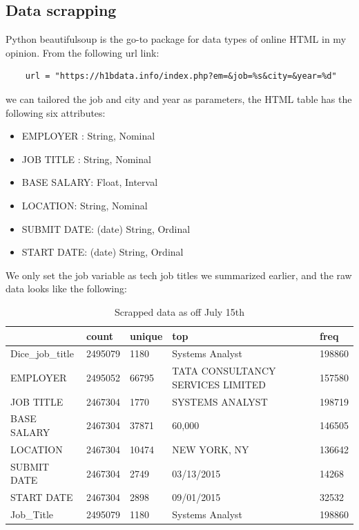 \subsection{Data scrapping}
Python beautifulsoup is the go-to package for data types of online HTML in my opinion. From the following url link:
{\small \begin{verbatim}
	url = "https://h1bdata.info/index.php?em=&job=%s&city=&year=%d"
\end{verbatim}}
we can tailored the job and city and year as parameters, the HTML table has the following six attributes:
\begin{itemize}
	\item EMPLOYER :  String, Nominal
	\item JOB TITLE :  String, Nominal
	\item BASE SALARY:  Float, Interval
	\item LOCATION:   String,  Nominal
	\item SUBMIT DATE:  (date) String, Ordinal
	\item START DATE:  (date) String, Ordinal
\end{itemize}
We only set the job variable as tech job titles we summarized earlier, and the raw data looks like the following:
	\begin{table}[h]
		\caption{Scrapped data as off July 15th}
		\resizebox{\columnwidth}{!}
		{%
	\begin{tabular}{lllll}
		\hline
		{} &    count & unique &                                                top &    freq \\
		\hline
		Dice\_job\_title &  2495079 &   1180 &                                    Systems Analyst &  198860 \\
		EMPLOYER       &  2495052 &  66795 &                  TATA CONSULTANCY SERVICES LIMITED &  157580 \\
		JOB TITLE      &  2467304 &   1770 &                                    SYSTEMS ANALYST &  198719 \\
		BASE SALARY    &  2467304 &  37871 &                                             60,000 &  146505 \\
		LOCATION       &  2467304 &  10474 &                                       NEW YORK, NY &  136642 \\
		SUBMIT DATE    &  2467304 &   2749 &                                         03/13/2015 &   14268 \\
		START DATE     &  2467304 &   2898 &                                         09/01/2015 &   32532 \\
		Job\_Title      &  2495079 &   1180 &                                    Systems Analyst &  198860 \\
		\hline
	\end{tabular}
    }
	\end{table}

